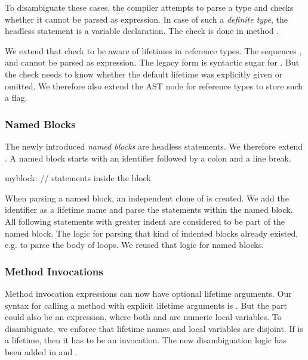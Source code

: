 To disambiguate these cases, the compiler attempts to parse a type and checks whether it cannot be parsed as expression.
In case of such a \emph{definite type}, the headless statement is a variable declaration.
The check is done in method .

We extend that check to be aware of lifetimes in reference types.
The sequences ,  and  cannot be parsed as expression.
The legacy form  is syntactic sugar for .
But the check needs to know whether the default lifetime \whileyinline{*} was explicitly given or omitted.
We therefore also extend the AST node for reference types to store such a flag.

\subsubsection{Named Blocks}
The newly introduced \emph{named blocks} are headless statements.
We therefore extend .
A named block starts with an identifier followed by a colon and a line break.

\begin{whileycode}
myblock:
	// statements inside the block
\end{whileycode}

When parsing a named block, an independent clone of  is created.
We add the identifier as a lifetime name and parse the statements within the named block.
All following statements with greater indent are considered to be part of the named block.
The logic for parsing that kind of indented blocks already existed, e.g. to parse the body of  loops.
We reused that logic for named blocks.

\subsubsection{Method Invocations}
Method invocation expressions can now have optional lifetime arguments.
Our syntax for calling a method with explicit lifetime arguments is .
But the part  could also be an expression, where both  and  are numeric local variables.
To disambiguate, we enforce that lifetime names and local variables are disjoint.
If  is a lifetime, then it has to be an invocation.
The new disambiguation logic has been added in  and .

